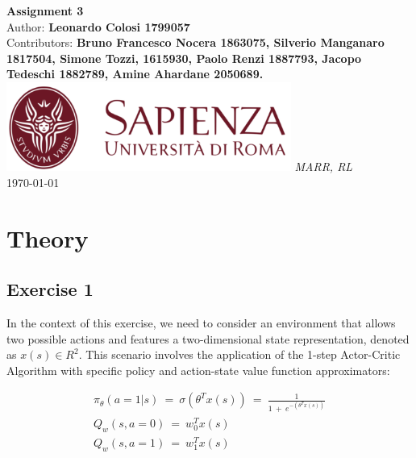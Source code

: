 \documentclass[10pt,a4paper]{article}
\begin{document}
\begin{titlepage}
    \begin{center}
        \vspace*{1cm}
        \Huge\textbf{Assignment 3}\\
        \vspace{1.5cm}
        \Large Author:
        \textbf{Leonardo Colosi 1799057}\\
        \vspace{0.5cm}
        \Large Contributors: \textbf{Bruno Francesco Nocera 1863075, Silverio Manganaro 1817504, Simone Tozzi, 1615930, Paolo Renzi 1887793, Jacopo Tedeschi 1882789, Amine Ahardane 2050689.}
        \vfill
        \includegraphics[width=0.7\textwidth]{images/sapienza_logo.png}
        \vfill
        \vspace{0.8cm}
        \Large \textit{MARR, RL}\\
        \today
    \end{center}
\end{titlepage}
\newpage

\tableofcontents
\newpage

\section{Theory}
\subsection{Exercise 1}
In the context of this exercise, we need to consider an environment that allows two possible actions and features a two-dimensional state representation, denoted as $x(s)\in R^2$. This scenario involves the application of the 1-step Actor-Critic Algorithm with specific policy and action-state value function approximators:

\begin{gather*}
    \pi_{\theta}(a=1|s) \:=\: \sigma(\theta^{T} x(s)) \:=\: \frac{1}{1\:+\:e^{-(\theta^{T} x(s))}} \\
    Q_w (s,a=0) \:=\: w_{0}^{T}x(s) \\
    Q_w (s,a=1) \:=\: w_{1}^{T}x(s)
\end{gather*} 
\end{document}
